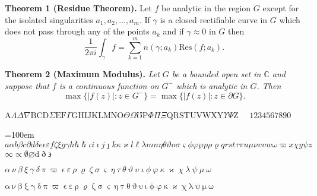 \textbf{Theorem 1 (Residue Theorem).}
Let $f$ be analytic in the region $G$ except for the isolated singularities $a_1,a_2,\ldots,a_m$. If $\gamma$ is a closed rectifiable curve in $G$ which does not pass through any of the points $a_k$ and if $\gamma\approx 0$ in $G$ then
\[
\frac{1}{2\pi i}\int_\gamma f = \sum_{k=1}^m n(\gamma;a_k) \text{Res}(f;a_k).
\]

\textbf{Theorem 2 (Maximum Modulus).}
\emph{Let $G$ be a bounded open set in $\mathbb{C}$ and suppose that $f$ is a continuous function on $G^-$ which is analytic in $G$. Then}
\[
\max\{|f(z)|:z\in G^-\}=\max \{|f(z)|:z\in \partial G \}.
\]
\vspace*{-1em}

\newcommand{\abc}{abcdefghijklmnopqrstuvwxyz}
\newcommand{\ABC}{ABCDEFGHIJKLMNOPQRSTUVWXYZ}
\newcommand{\alphabeta}{\alpha\beta\gamma\delta\epsilon\varepsilon\zeta\eta\theta\vartheta\iota\kappa\varkappa\lambda\mu\nu\xi o\pi\varpi\rho\varrho\sigma\varsigma\tau\upsilon\phi\varphi\chi\psi\omega}
\newcommand{\AlphaBeta}{\Gamma\Delta\Theta\Lambda\Xi\Pi\Sigma\Upsilon\Phi\Psi\Omega}




$\mathrm{A} \Lambda \Delta \nabla \mathrm{B C D} \Sigma \mathrm{E F} \Gamma \mathrm{G H I J K L M N O} \Theta \Omega \mho \mathrm{P} \Phi \Pi \Xi \mathrm{Q R S T U V W X Y} \Upsilon \Psi \mathrm{Z} $  $ \quad 1234567890 $


{\par {} \emergencystretch=100em $a\alpha b \beta c \partial d
  \delta e \epsilon \varepsilon f \zeta \xi g \gamma h \hbar \hslash \iota i
  \imath j \jmath k \kappa \varkappa l \ell \lambda m n \eta \theta \vartheta
  o \sigma \varsigma \phi \varphi \wp p \rho \varrho q r s t \tau \pi u \mu
  \nu v \upsilon w \omega \varpi x \chi y \psi z$ \linebreak[3] $\infty
  \propto \emptyset \varnothing \mathrm{d}\eth \backepsilon$\par}

$\alpha~\nu~\beta~\xi~\gamma~\delta~\pi~\varpi~\epsilon~\varepsilon~\rho~\varrho~\zeta~\sigma~\varsigma~\eta~\tau~\theta~\vartheta~\upsilon~\iota~\phi~\varphi~\kappa~\varkappa~\chi~\lambda~\psi~\mu~\omega
$

$\mathup{\alpha~\nu~\beta~\xi~\gamma~\delta~\pi~\varpi~\epsilon~\varepsilon~\rho~\varrho~\zeta~\sigma~\varsigma~\eta~\tau~\theta~\vartheta~\upsilon~\iota~\phi~\varphi~\kappa~\varkappa~\chi~\lambda~\psi~\mu~\omega}
$
 


